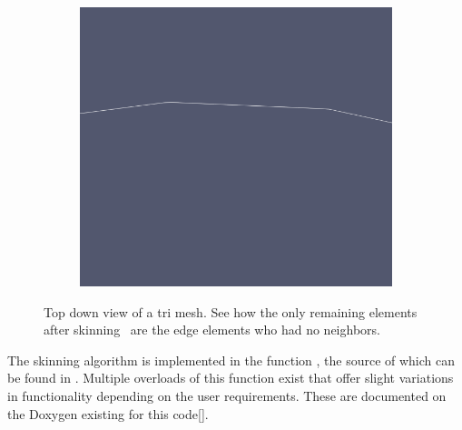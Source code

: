 \documentclass[12pt, letterpaper]{article}
\begin{document}
\begin{figure}[ht]
\begin{subfigure}{0.48\textwidth}
    	\includegraphics[width=\linewidth]{circleSkinNeighbExample.png}
    \end{subfigure}
    
	\caption{Top down view of a tri mesh. See how the only remaining elements after skinning \
	are the edge elements who had no neighbors.}
	\label{2DSkinExample}
\end{figure}
The skinning algorithm is implemented in the function , the source of which can be found in . Multiple overloads of this function exist that offer slight variations in functionality depending on the user requirements. These are documented on the Doxygen existing for this code[]. 
\end{document}
